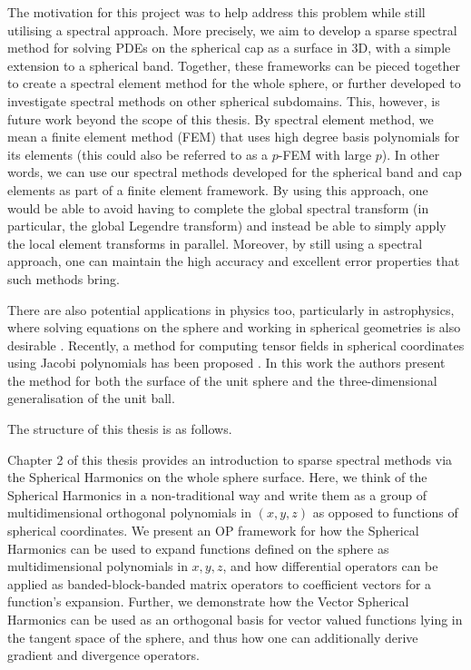 The motivation for this project was to help address this problem while still utilising a spectral approach. More precisely, we aim to develop a sparse spectral method for solving PDEs on the spherical cap as a surface in 3D, with a simple extension to a spherical band. Together, these frameworks can be pieced together to create a spectral element method for the whole sphere, or further developed to investigate spectral methods on other spherical subdomains. This, however, is future work beyond the scope of this thesis. By spectral element method, we mean a finite element method (FEM) that uses high degree basis polynomials for its elements (this could also be referred to as a $p$-FEM with large $p$). In other words, we can use our spectral methods developed for the spherical band and cap elements as part of a finite element framework. By using this approach, one would be able to avoid having to complete the global spectral transform (in particular, the global Legendre transform) and instead be able to simply apply the local element transforms in parallel. Moreover, by still using a spectral approach, one can maintain the high accuracy and excellent error properties that such methods bring.

There are also potential applications in physics too, particularly in astrophysics, where solving equations on the sphere and working in spherical geometries is also desirable \cite{vasil2019tensor}. Recently, a method for computing tensor fields in spherical coordinates using Jacobi polynomials has been proposed \cite{vasil2019tensor}. In this work the authors present the method for both the surface of the unit sphere and the three-dimensional generalisation of the unit ball. 

The structure of this thesis is as follows.

Chapter 2 of this thesis provides an introduction to sparse spectral methods via the Spherical Harmonics on the whole sphere surface. Here, we think of the Spherical Harmonics in a non-traditional way and write them as a group of multidimensional orthogonal polynomials in $(x,y,z)$ as opposed to functions of spherical coordinates. We present an OP framework for how the Spherical Harmonics can be used to expand functions defined on the sphere as multidimensional polynomials in $x, y, z$, and how differential operators can be applied as banded-block-banded matrix operators to coefficient vectors for a function's expansion. Further, we demonstrate how the Vector Spherical Harmonics can be used as an orthogonal basis for vector valued functions lying in the tangent space of the sphere, and thus how one can additionally derive gradient and divergence operators.

